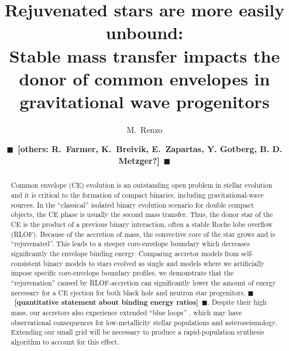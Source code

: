 \documentclass[twocolumn,twocolappendix,trackchanges]{aastex63}
\newcommand{\todo}[1]{{\large $\blacksquare$~\textbf{\color{red}[#1]}}~$\blacksquare$}
\begin{document}
\graphicspath{{./figures/}}

\title{Rejuvenated stars are more easily unbound:\\ Stable
  mass transfer impacts the donor of common envelopes  in gravitational wave progenitors}

\author[0000-0002-6718-9472]{M.~Renzo}

\author{\todo{others: R.~Farmer, K.~Breivik, E.~Zapartas, Y. Gotberg,
    B. D. Metzger?}}


\begin{abstract}
  Common envelope (CE) evolution is an outstanding open problem in
  stellar evolution and it is critical to the formation of compact
  binaries, including gravitational-wave sources. In the ``classical''
  isolated binary evolution scenario for double compact objects, the
  CE phase is usually the second mass transfer. Thus, the donor star
  of the CE is the product of a previous binary interaction, often a
  stable Roche lobe overflow (RLOF). Because of the accretion of mass,
  the convective core of the star grows and is ``rejuvenated''. This
  leads to a steeper core-envelope boundary which decreases
  significantly the envelope binding energy. Comparing accretor models
  from self-consistent binary models to stars evolved as single and
  models where we artificially impose specific core-envelope boundary
  profiles, we demonstrate that the ``rejuvenation'' caused by
  RLOF-accretion can significantly lower the amount of energy necessary
  for a CE ejection for both black hole and neutron star progenitors.
  \todo{quantitative statement about binding energy ratios}.
  Despite their high mass, our accretors also experience extended
  ``blue loops'' , which may have observational consequences for
  low-metallicity stellar populations and asteroseismology. Extending
  our small grid will be necessary to produce a rapid-population
  synthesis algorithm to account for this effect.
\end{abstract}

\end{document}
